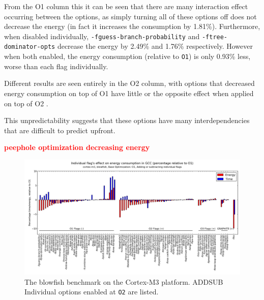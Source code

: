 \documentclass[twocolumn]{article}
\newcommand{\todo}[1]{\textbf{\textcolor{red}{#1}}}
\begin{document}
 From the O1 column this it can be seen that there are many interaction effect occurring between the options, as simply turning all of these options off does not decrease the energy (in fact it increases the consumption by 1.81\%). Furthermore, when disabled individually, \texttt{-fguess-branch-probability} and \texttt{-ftree-dominator-opts} decrease the energy by 2.49\% and 1.76\% respectively. However when both enabled, the energy consumption (relative to \texttt{O1}) is only 0.93\% less, worse than each flag individually.

Different results are seen entirely in the O2 column, with options that decreased energy consumption on top of O1 have little or the opposite effect when applied on top of O2
.

This unpredictability suggests that these options have many interdependencies that are difficult to predict upfront.

\todo{peephole optimization decreasing energy }

\begin{figure}[tb]
	\includegraphics[width=\linewidth]{cortex-m3/O1_addsub_blowfish.png}
	\caption{The blowfish benchmark on the Cortex-M3 platform. ADDSUB Individual options enabled at \texttt{O2} are listed.}
	\label{Fig:AddsubO1Blowfish}
\end{figure}
\end{document}
